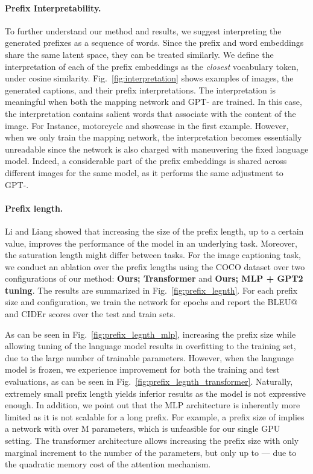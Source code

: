 \paragraph{Prefix Interpretability.} 


To further understand our method and results, we suggest interpreting the generated prefixes as a sequence of words. Since the prefix and word embeddings share the same latent space, they can be treated similarly. 
We define the interpretation of each of the  prefix embeddings as the \textit{closest} vocabulary token, under cosine similarity.
Fig.~\ref{fig:interpretation} shows examples of images, the generated captions, and their prefix interpretations. The interpretation is meaningful when both the mapping network and GPT- are trained. In this case, the interpretation contains salient words that associate with the content of the image. For Instance, motorcycle and showcase in the first example. However, when we only train the mapping network, the interpretation becomes essentially unreadable since the network is also charged with maneuvering the fixed language model. Indeed, a considerable part of the prefix embeddings is shared across different images for the same model, as it performs the same adjustment to GPT-.






\paragraph{Prefix length.}

Li and Liang \cite{li2021prefix} showed that increasing the size of the prefix length, up to a certain value, improves the performance of the model in an underlying task. Moreover, the saturation length might differ between tasks. For the image captioning task, we conduct an ablation over the prefix lengths using the COCO dataset over two configurations of our method:
\textbf{Ours; Transformer} and \textbf{Ours; MLP + GPT2 tuning}. 
The results are summarized in Fig.~\ref{fig:prefix_legnth}. For each prefix size and configuration, we train the network for  epochs and report the BLEU@ and CIDEr scores over the test and train sets.

As can be seen in Fig.~\ref{fig:prefix_legnth_mlp}, increasing the prefix size while allowing tuning of the language model results in overfitting to the training set, due to the large number of trainable parameters. However, when the language model is frozen, we experience improvement for both the training and test evaluations, as can be seen in Fig.~\ref{fig:prefix_legnth_transformer}. Naturally, extremely small prefix length yields inferior results as the model is not expressive enough. In addition, we point out that the MLP architecture is inherently more limited as it is not scalable for a long prefix. For example, a prefix size of  implies a network with over M parameters, which is unfeasible for our single GPU setting. The transformer architecture allows increasing the prefix size with only marginal increment to the number of the parameters, but only up to  --- due to the quadratic memory cost of the attention mechanism.



